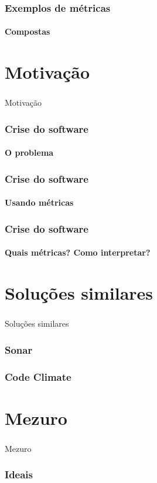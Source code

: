 \documentclass{beamer}
\begin{document}
  \begin{frame}
    \frametitle{Exemplos de métricas}
    \framesubtitle{Compostas}
  \end{frame}

\section{Motivação}
\begin{frame}
  \frametitle{}
  \framesubtitle{}

  Motivação
\end{frame}

\begin{frame}
  \frametitle{Crise do software}
  \framesubtitle{O problema}
\end{frame}

\begin{frame}
  \frametitle{Crise do software}
  \framesubtitle{Usando métricas}
\end{frame}

\begin{frame}
  \frametitle{Crise do software}
  \framesubtitle{Quais métricas? Como interpretar?}
\end{frame}

\section{Soluções similares}
\begin{frame}
  \frametitle{}
  \framesubtitle{}

  Soluções similares
\end{frame}

\begin{frame}
  \frametitle{Sonar}
  \framesubtitle{}
\end{frame}

\begin{frame}
  \frametitle{Code Climate}
  \framesubtitle{}
\end{frame}

\section{Mezuro}
\begin{frame}
  \frametitle{}
  \framesubtitle{}

  Mezuro
\end{frame}

\begin{frame}
  \frametitle{Ideais}
  \framesubtitle{}
\end{frame}
\end{document}
